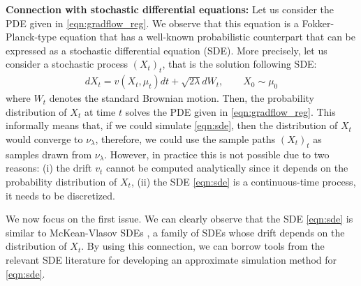\textbf{Connection with stochastic differential equations: }
%
Let us consider the PDE given in \eqref{eqn:gradflow_reg}. We observe that this equation is a Fokker-Planck-type equation \cite{bogachev2015fokker} that has a well-known probabilistic counterpart that can be expressed as a stochastic differential equation (SDE). More precisely, let us consider a stochastic process $(X_t)_{t}$, that is the solution following SDE:
\begin{align}
d X_t = v(X_t,\mu_t) dt + \sqrt{2 \lambda } d W_t, \qquad X_0 \sim \mu_0 \label{eqn:sde}
\end{align}
where $W_t$ denotes the standard Brownian motion. Then, the probability distribution of $X_t$ at time $t$ solves the PDE given in \eqref{eqn:gradflow_reg}. This informally means that, if we could simulate \eqref{eqn:sde}, then the distribution of $X_t$ would converge to $\nu_\lambda$, therefore, we could use the sample paths $(X_t)_t$ as samples drawn from $\nu_\lambda$. However, in practice this is not possible due to two reasons: (i) the drift $v_t$ cannot be computed analytically since it depends on the probability distribution of $X_t$, (ii) the SDE \eqref{eqn:sde} is a continuous-time process, it needs to be discretized.







We now focus on the first issue.
We can clearly observe that the SDE \eqref{eqn:sde} is similar to McKean-Vlasov SDEs \cite{veretennikov2006ergodic,mishura2016existence}, a family of SDEs whose drift depends on the distribution of $X_t$. By using this connection, we can borrow tools from the relevant SDE literature \cite{malrieu03,cgm-08} for developing an approximate simulation method for \eqref{eqn:sde}.

